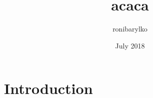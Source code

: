 \documentclass{article}
\title{acaca}
\author{ronibarylko }
\date{July 2018}
\begin{document}
\maketitle

\section{Introduction}
\end{document}
